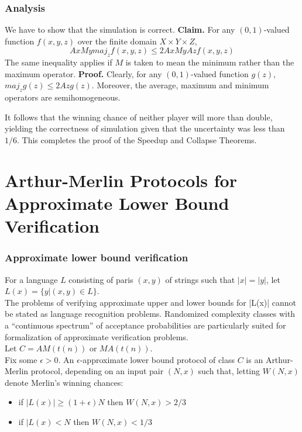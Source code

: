 \documentclass{beamer}
\begin{document}
\begin{frame}
\frametitle{Analysis}
We have to show that the simulation is correct.
\textbf{Claim.} For any $(0, 1)$-valued function $f(x, y, z)$ over the finite domain $X \times Y \times Z$, $$AxMy maj_z f(x, y, z) \leq 2 A x M y A z f(x,y,z)$$
The same inequality applies if $M$ is taken to mean the minimum rather than the maximum operator.
\textbf{Proof.} Clearly, for any $(0,1)$-valued function $g(z)$, $maj_z g(z) \leq 2 A z g(z)$. Moreover, the average, maximum and minimum operators are semihomogeneous.

It follows that the winning chance of neither player will more than double, yielding the correctness of simulation given that the uncertainty was less than $1/6$. This completes the proof of the Speedup and Collapse Theorems.
\end{frame}



\section{Arthur-Merlin Protocols for Approximate Lower Bound Verification}

\begin{frame}
\frametitle{Approximate lower bound verification}
For a language $L$ consisting of paris $(x, y)$ of strings such that $|x| = |y|$, let $L(x) = \{ y | (x, y) \in L \}$.\\
The problems of verifying approximate upper and lower bounds for |L(x)| cannot be stated as language recognition problems. Randomized complexity classes with a ``continuous spectrum'' of acceptance probabilities are particularly suited for formalization of approximate verification problems.\\
Let $C = AM(t(n))$ or $MA(t(n))$.\\
Fix some $\epsilon > 0$. An $\epsilon$-approximate lower bound protocol of class $C$ is an Arthur-Merlin protocol, depending on an input pair $(N, x)$ such that, letting $W(N, x)$ denote Merlin's winning chances:
\begin{itemize}
	\item if $|L(x)| \geq (1 + \epsilon) N$ then $W(N, x) > 2/3$
	\item if $|L(x) < N$ then $W(N, x) < 1/3$
\end{itemize}
\end{frame}
\end{document}
